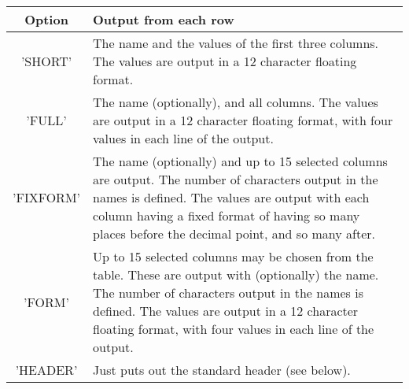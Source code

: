 \begin{small}
{{\begin{tabular}{|c|p{4.5in}|}\hline
   Option   &   Output from each row \\ \hline
  'SHORT'   &  The name and the values of the first three columns.
               The values are output in a 12 character floating format. \\
  'FULL'    &  The name (optionally), and all columns. The values are
               output in a 12 character floating format, with four
               values in each line of the output. \\
  'FIXFORM' &  The name (optionally) and up to 15 selected columns are
               output. The number of characters output in the names is
               defined. The values are output with each column having a
               fixed format of having so many places before the
               decimal point, and so many after. \\
  'FORM'    &  Up to 15 selected columns may be chosen from the table.
               These are output with (optionally) the name. The number
               of characters output in the names is defined. The values
               are output in a 12 character floating format, with four
               values in each line of the output. \\
  'HEADER'  &  Just puts out the standard header (see below). \\ \hline
\end{tabular}
 
}}
\end{small}
